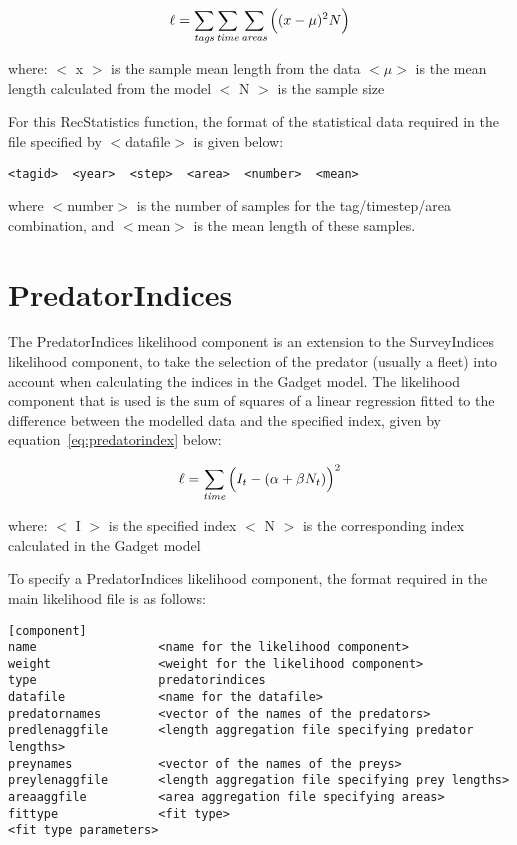 \documentclass [a4paper, 10pt]{book}
\begin{document}
\begin{equation}\label{eq:recstat3}
\ell = \sum_{\it tags}\sum_{\it time}\sum_{\it areas} \Big((x-\mu)^2 N\Big)
\end{equation}

where:\newline
$<$ x $>$ is the sample mean length from the data\newline
$<\mu>$ is the mean length calculated from the model\newline
$<$ N $>$ is the sample size

\bigskip
For this RecStatistics function, the format of the statistical data required in the file specified by $<$datafile$>$ is given below:

{\small\begin{verbatim}
<tagid>  <year>  <step>  <area>  <number>  <mean>
\end{verbatim}}

where $<$number$>$ is the number of samples for the tag/timestep/area combination, and $<$mean$>$ is the mean length of these samples.

\section{PredatorIndices}\label{sec:predatorindex}
The PredatorIndices likelihood component is an extension to the SurveyIndices likelihood component, to take the selection of the predator (usually a fleet) into account when calculating the indices in the Gadget model.  The likelihood component that is used is the sum of squares of a linear regression fitted to the difference between the modelled data and the specified index, given by equation~\ref{eq:predatorindex} below:

\begin{equation}\label{eq:predatorindex}
\ell = \sum_{\it time}\Big(I_{t} - (\alpha + \beta N_{t})\Big)^2
\end{equation}

where:\newline
$<$ I $>$ is the specified index\newline
$<$ N $>$ is the corresponding index calculated in the Gadget model

\bigskip
To specify a PredatorIndices likelihood component, the format required in the main likelihood file is as follows:

{\small\begin{verbatim}
[component]
name                 <name for the likelihood component>
weight               <weight for the likelihood component>
type                 predatorindices
datafile             <name for the datafile>
predatornames        <vector of the names of the predators>
predlenaggfile       <length aggregation file specifying predator lengths>
preynames            <vector of the names of the preys>
preylenaggfile       <length aggregation file specifying prey lengths>
areaaggfile          <area aggregation file specifying areas>
fittype              <fit type>
<fit type parameters>
\end{verbatim}}
\end{document}
